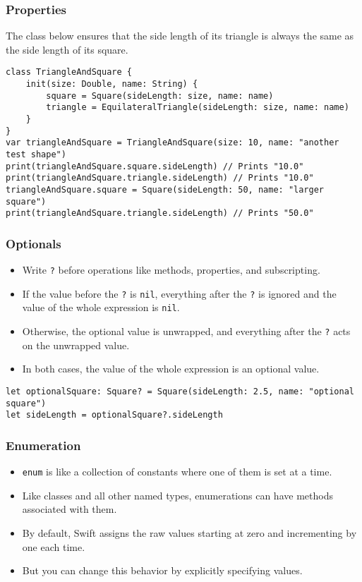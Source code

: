 \begin{frame}[fragile] \frametitle{Properties}

The class below ensures that the side length of its triangle is always the same as the side length of its square.

\begin{lstlisting}
class TriangleAndSquare {
    init(size: Double, name: String) {
        square = Square(sideLength: size, name: name)
        triangle = EquilateralTriangle(sideLength: size, name: name)
    }
}
var triangleAndSquare = TriangleAndSquare(size: 10, name: "another test shape")
print(triangleAndSquare.square.sideLength) // Prints "10.0"
print(triangleAndSquare.triangle.sideLength) // Prints "10.0"
triangleAndSquare.square = Square(sideLength: 50, name: "larger square")
print(triangleAndSquare.triangle.sideLength) // Prints "50.0"
\end{lstlisting}


\end{frame}

\begin{frame}[fragile] \frametitle{Optionals}

\begin{itemize}
\item Write \lstinline|?| before operations like methods, properties, and subscripting. 
\item If the value before the \lstinline|?| is \lstinline|nil|, everything after the \lstinline|?| is ignored and the value of the whole expression is \lstinline|nil|. 
\item Otherwise, the optional value is unwrapped, and everything after the \lstinline|?| acts on the unwrapped value. 
\item In both cases, the value of the whole expression is an optional value.
\end{itemize}

\begin{lstlisting}
let optionalSquare: Square? = Square(sideLength: 2.5, name: "optional square")
let sideLength = optionalSquare?.sideLength
\end{lstlisting}


\end{frame}

\begin{frame}[fragile] \frametitle{Enumeration}

\begin{itemize}
\item \lstinline|enum| is like a collection of constants where one of them is set at a time. 
\item Like classes and all other named types, enumerations can have methods associated with them.
\item By default, Swift assigns the raw values starting at zero and incrementing by one each time.
\item But you can change this behavior by explicitly specifying values. 
\end{itemize}

\end{frame}


